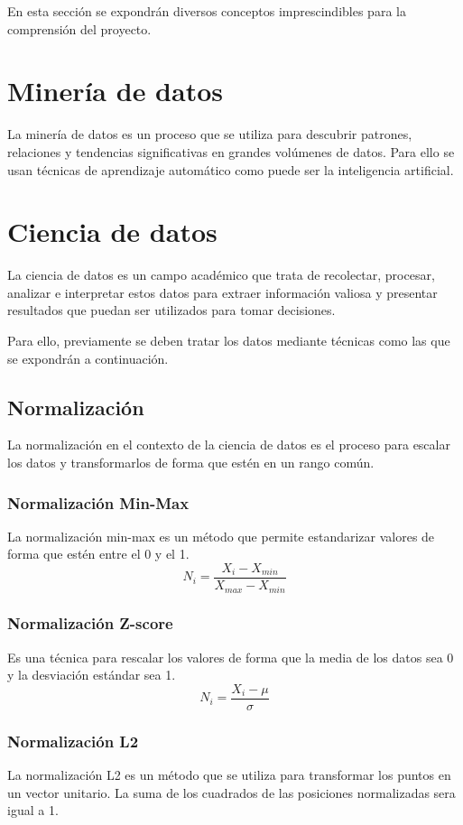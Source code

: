 En esta sección se expondrán diversos conceptos imprescindibles para la comprensión del proyecto.

\section{Minería de datos}
La minería de datos es un proceso que se utiliza para descubrir patrones, relaciones y tendencias significativas en grandes volúmenes de datos. Para ello se usan técnicas de aprendizaje automático como puede ser la inteligencia artificial.

\section{Ciencia de datos}
La ciencia de datos es un campo académico que trata de recolectar, procesar, analizar e interpretar estos datos para extraer información valiosa y presentar resultados que puedan ser utilizados para tomar decisiones.

Para ello, previamente se deben tratar los datos mediante técnicas como las que se expondrán a  continuación.
\subsection{Normalización} 
La normalización en el contexto de la ciencia de datos es el proceso para escalar los datos y transformarlos de forma que estén en un rango común. 
\subsubsection{Normalización Min-Max}
La normalización min-max es un método que permite estandarizar valores de forma que estén entre el 0 y el 1. 
\begin{equation}
	N_i = \frac{X_i - X_{min}}{X_{max} - X_{min}}
\end{equation}
\subsubsection{Normalización Z-score}
Es una técnica para rescalar los valores de forma que la media de los datos sea 0 y la desviación estándar sea 1.
\begin{equation}
	N_i = \frac{X_i - \mu}{\sigma}
\end{equation}

\subsubsection{Normalización L2}
La normalización L2 es un método que se utiliza para transformar los puntos en un vector unitario. La suma de los cuadrados de las posiciones normalizadas sera igual a 1.

